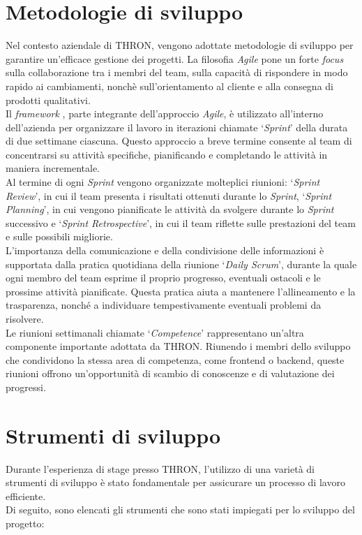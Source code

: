 \section{Metodologie di sviluppo}
Nel contesto aziendale di THRON, vengono adottate metodologie di sviluppo  per garantire un'efficace
gestione dei progetti. La filosofia \textit{Agile} pone un forte \textit{focus} sulla collaborazione tra i membri del team,
sulla capacità di rispondere in modo rapido ai cambiamenti, nonchè sull'orientamento al cliente e alla consegna di prodotti qualitativi.\\
Il \textit{framework} , parte integrante dell'approccio \textit{Agile}, è utilizzato all'interno dell'azienda per organizzare il lavoro in iterazioni chiamate
`\textit{Sprint}' della durata di due settimane ciascuna. Questo approccio a breve termine consente al team di concentrarsi su attività specifiche, pianificando
e completando le attività in maniera incrementale.\\
Al termine di ogni \textit{Sprint} vengono organizzate molteplici riunioni: `\textit{Sprint Review}', in cui il team presenta i risultati ottenuti durante lo \textit{Sprint},
`\textit{Sprint Planning}', in cui vengono pianificate le attività da svolgere durante lo \textit{Sprint} successivo e `\textit{Sprint Retrospective}', in cui il team riflette sulle prestazioni del team e sulle possibili migliorie.\\
L'importanza della comunicazione e della condivisione delle informazioni è supportata dalla pratica quotidiana della riunione `\textit{Daily Scrum}', durante la quale
ogni membro del team esprime il proprio progresso, eventuali ostacoli e le prossime attività pianificate. Questa pratica aiuta a mantenere l'allineamento e
la trasparenza, nonché a individuare tempestivamente eventuali problemi da risolvere.\\
Le riunioni settimanali chiamate `\textit{Competence}' rappresentano un'altra componente importante adottata da THRON. Riunendo i membri dello sviluppo 
che condividono la stessa area di competenza, come frontend o backend, queste riunioni offrono un'opportunità di scambio di conoscenze e di valutazione dei progressi.
\section{Strumenti di sviluppo}
Durante l'esperienza di stage presso THRON, l'utilizzo di una varietà di strumenti di sviluppo è stato fondamentale per assicurare un processo di lavoro efficiente.\\
Di seguito, sono elencati gli strumenti che sono stati impiegati per lo sviluppo del progetto:

